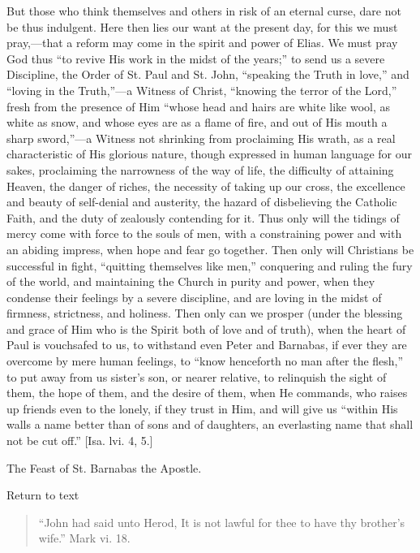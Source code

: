 But those who think themselves and others in risk of an eternal
curse, dare not be thus indulgent. Here then lies our want at the
present day, for this we must pray,—that a reform may come in the
spirit and power of Elias. We must pray God thus ``to revive His
work in the midst of the years;'' to send us a severe Discipline,
the Order of St. Paul and St. John, ``speaking the Truth in
love,'' and ``loving in the Truth,''—a Witness of Christ,
``knowing the terror of the Lord,'' fresh from the presence of
Him ``whose head and hairs are white like wool, as white as snow,
and whose eyes are as a flame of fire, and out of His mouth a sharp
sword,''—a Witness not shrinking from proclaiming His wrath, as a
real characteristic of His glorious nature, though expressed in human
language for our sakes, proclaiming the narrowness of the way of life,
the difficulty of attaining Heaven, the danger of riches, the necessity
of taking up our cross, the excellence and beauty of self-denial and
austerity, the hazard of disbelieving the Catholic Faith, and the duty
of zealously contending for it. Thus only will the tidings of mercy come
with force to the souls of men, with a constraining power and with an
abiding impress, when hope and fear go together. Then only will
Christians be successful in fight, ``quitting themselves like
men,'' conquering and ruling the fury of the world, and maintaining
the Church in purity and power, when they condense their feelings by a
severe discipline, and are loving in the midst of firmness, strictness,
and holiness. Then only can we prosper (under the blessing and grace of
Him who is the Spirit both of love and of truth), when the heart of Paul
is vouchsafed to us, to withstand even Peter and Barnabas, if ever they
are overcome by mere human feelings, to ``know henceforth no man
after the flesh,'' to put away from us sister's son, or nearer
relative, to relinquish the sight of them, the hope of them, and the
desire of them, when He commands, who raises up friends even to the
lonely, if they trust in Him, and will give us ``within His walls a
name better than of sons and of daughters, an everlasting name that
shall not be cut off.'' [Isa. lvi. 4, 5.]


The Feast of St. Barnabas the Apostle.

Return to text


\begin{quote}

``John had said unto Herod, It is not lawful for thee to have
thy brother's wife.'' Mark vi. 18.

\end{quote}

